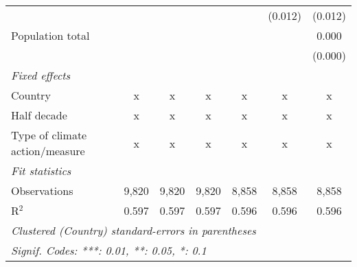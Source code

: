 \begin{tabular}{lcccccc}
                                                      &               &               &               &                & (0.012)        & (0.012)\\   
   Population total                                   &               &               &               &                &                & 0.000\\   
                                                      &               &               &               &                &                & (0.000)\\   
   \emph{Fixed effects}\\
   Country                                            & x             & x             & x             & x              & x              & x\\  
   Half decade                                        & x             & x             & x             & x              & x              & x\\  
   Type of climate action/measure                     & x             & x             & x             & x              & x              & x\\  
   \midrule \emph{Fit statistics}\\
   Observations                                       & 9,820         & 9,820         & 9,820         & 8,858          & 8,858          & 8,858\\  
   R$^2$                                              & 0.597         & 0.597         & 0.597         & 0.596          & 0.596          & 0.596\\  
   \midrule
   \multicolumn{7}{l}{\emph{Clustered (Country) standard-errors in parentheses}}\\
   \multicolumn{7}{l}{\emph{Signif. Codes: ***: 0.01, **: 0.05, *: 0.1}}\\
\end{tabular}
\par\endgroup


